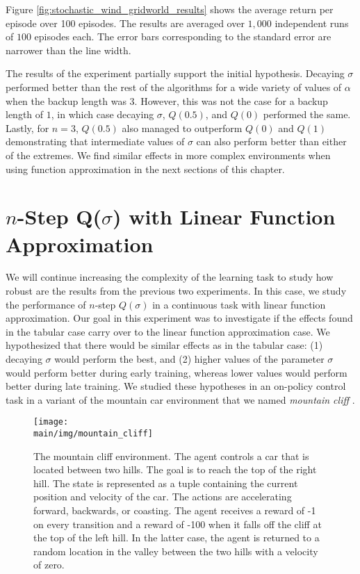 Figure \ref{fig:stochastic_wind_gridworld_results} shows the average return per episode over 100 episodes.
The results are averaged over $1,000$ independent runs of $100$ episodes each.
The error bars corresponding to the standard error are narrower than the line width.

The results of the experiment partially support the initial hypothesis.
Decaying $\sigma$ performed better than the rest of the algorithms for a wide variety of values of $\alpha$ when the backup length was $3$.
However, this was not the case for a backup length of $1$, in which case decaying $\sigma$, $Q(0.5)$, and $Q(0)$ performed the same.
Lastly, for $n=3$, $Q(0.5)$  also managed to outperform $Q(0)$ and $Q(1)$ demonstrating that intermediate values of $\sigma$ can also perform better than either of the extremes.
We find similar effects in more complex environments when using function approximation in the next sections of this chapter.

\section{$n$-Step Q($\sigma$) with Linear Function Approximation}

We will continue increasing the complexity of the learning task to study how robust are the results from the previous two experiments.
In this case, we study the performance of $n$-step $Q(\sigma)$ in a continuous task with linear function approximation.
Our goal in this experiment was to investigate if the effects found in the tabular case carry over to the linear function approximation case.
We hypothesized that there would be similar effects as in the tabular case: (1) decaying $\sigma$ would perform the best, and (2) higher values of the parameter $\sigma$ would perform better during early training, whereas lower values would perform better during late training.
We studied these hypotheses in an on-policy control task in a variant of the mountain car environment that we named \textit{mountain cliff} \parencite{Sutton:1998:IRL:551283}.

\begin{figure}[t]
    \centering
    \texttt{[image: \\main/img/mountain\_cliff]}
    \caption[The Mountain Cliff Environment] {
    The mountain cliff environment. 
    The agent controls a car that is located between two hills.
    The goal is to reach the top of the right hill.
    The state is represented as a tuple containing the current position and velocity of the car.
    The actions are accelerating forward, backwards, or coasting.
    The agent receives a reward of -1 on every transition and a reward of -100 when it falls off the cliff at the top of the left hill.
    In the latter case, the agent is returned to a random location in the valley between the two hills with a velocity of zero.
    }
    \label{fig:mountain_cliff}
\end{figure}


